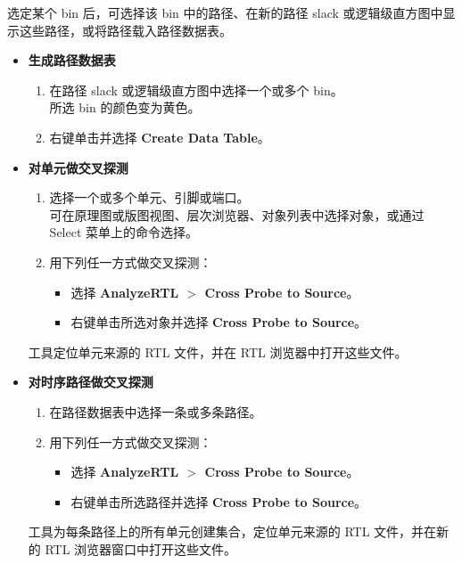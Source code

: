 选定某个 bin 后，可选择该 bin 中的路径、在新的路径 slack 或逻辑级直方图中显示这些路径，或将路径载入路径数据表。

\begin{itemize}
  \item \textbf{生成路径数据表}
  \begin{enumerate}
    \item 在路径 slack 或逻辑级直方图中选择一个或多个 bin。\\
          所选 bin 的颜色变为黄色。
    \item 右键单击并选择 \textbf{Create Data Table}。
  \end{enumerate}
\end{itemize}


\begin{itemize}
  \item \textbf{对单元做交叉探测}
  \begin{enumerate}
    \item 选择一个或多个单元、引脚或端口。\\
          可在原理图或版图视图、层次浏览器、对象列表中选择对象，或通过 Select 菜单上的命令选择。
    \item 用下列任一方式做交叉探测：
    \begin{itemize}
      \item 选择 \textbf{AnalyzeRTL $>$ Cross Probe to Source}。
      \item 右键单击所选对象并选择 \textbf{Cross Probe to Source}。
    \end{itemize}
  \end{enumerate}
        工具定位单元来源的 RTL 文件，并在 RTL 浏览器中打开这些文件。
\end{itemize}

\begin{itemize}
  \item \textbf{对时序路径做交叉探测}
  \begin{enumerate}
    \item 在路径数据表中选择一条或多条路径。
    \item 用下列任一方式做交叉探测：
    \begin{itemize}
      \item 选择 \textbf{AnalyzeRTL $>$ Cross Probe to Source}。
      \item 右键单击所选路径并选择 \textbf{Cross Probe to Source}。
    \end{itemize}
  \end{enumerate}
        工具为每条路径上的所有单元创建集合，定位单元来源的 RTL 文件，并在新的 RTL 浏览器窗口中打开这些文件。
\end{itemize}


